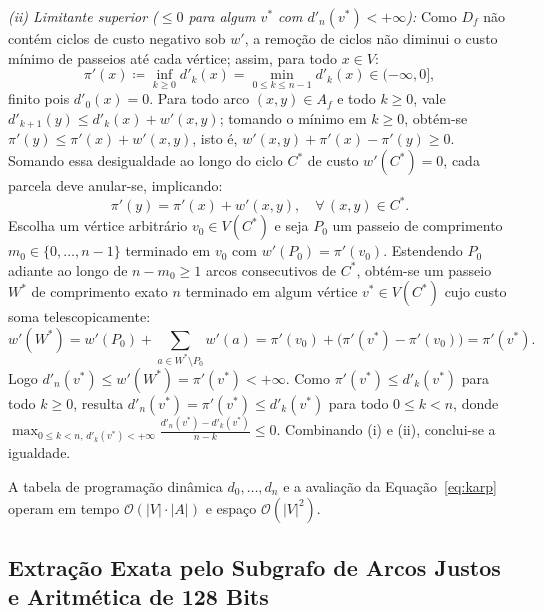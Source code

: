 \begin{demonstracao}
\medskip
\noindent \textit{(ii) Limitante superior ($\le 0$ para algum $v^*$ com $d'_n(v^*) < +\infty$):}
Como $D_f$ não contém ciclos de custo negativo sob $w'$, a remoção de ciclos não diminui o custo mínimo de passeios até cada vértice; assim, para todo $x \in V$:
\begin{equation*}
    \pi'(x) \coloneqq \inf_{k \ge 0} d'_k(x) = \min_{0 \le k \le n-1} d'_k(x) \in (-\infty, 0],
\end{equation*}
finito pois $d'_0(x) = 0$. Para todo arco $(x,y) \in A_f$ e todo $k \ge 0$, vale $d'_{k+1}(y) \le d'_k(x) + w'(x,y)$; tomando o mínimo em $k \ge 0$, obtém-se $\pi'(y) \le \pi'(x) + w'(x,y)$, isto é, $w'(x,y) + \pi'(x) - \pi'(y) \ge 0$. Somando essa desigualdade ao longo do ciclo $C^*$ de custo $w'(C^*) = 0$, cada parcela deve anular-se, implicando:
\begin{equation*}
    \pi'(y) = \pi'(x) + w'(x,y), \quad \forall\, (x,y) \in C^*.
\end{equation*}
Escolha um vértice arbitrário $v_0 \in V(C^*)$ e seja $P_0$ um passeio de comprimento $m_0 \in \{0, \dots, n-1\}$ terminado em $v_0$ com $w'(P_0) = \pi'(v_0)$. Estendendo $P_0$ adiante ao longo de $n - m_0 \ge 1$ arcos consecutivos de $C^*$, obtém-se um passeio $W^*$ de comprimento exato $n$ terminado em algum vértice $v^* \in V(C^*)$ cujo custo soma telescopicamente:
\begin{equation*}
    w'(W^*) = w'(P_0) + \sum_{a \in W^* \setminus P_0} w'(a) = \pi'(v_0) + \bigl(\pi'(v^*) - \pi'(v_0)\bigr) = \pi'(v^*).
\end{equation*}
Logo $d'_n(v^*) \le w'(W^*) = \pi'(v^*) < +\infty$. Como $\pi'(v^*) \le d'_k(v^*)$ para todo $k \ge 0$, resulta $d'_n(v^*) = \pi'(v^*) \le d'_k(v^*)$ para todo $0 \le k < n$, donde $\max_{0 \le k < n,\, d'_k(v^*) < +\infty} \frac{d'_n(v^*) - d'_k(v^*)}{n - k} \le 0$. Combinando (i) e (ii), conclui-se a igualdade.
\end{demonstracao}

A tabela de programação dinâmica $d_0, \dots, d_n$ e a avaliação da Equação~\eqref{eq:karp} operam em tempo $\mathcal{O}(|V| \cdot |A|)$ e espaço $\mathcal{O}(|V|^2)$.


\subsection{Extração Exata pelo Subgrafo de Arcos Justos e Aritmética de 128 Bits}

